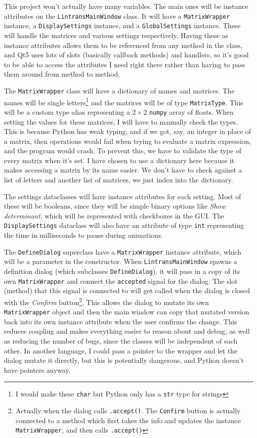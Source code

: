 \documentclass[../main.tex]{subfiles}
\begin{document}
This project won't actually have many variables. The main ones will be instance attributes on the \texttt{LintransMainWindow} class. It will have a \texttt{MatrixWrapper} instance, a \texttt{DisplaySettings} instance, and a \texttt{GlobalSettings} instance. These will handle the matrices and various settings respectively. Having these as instance attributes allows them to be referenced from any method in the class, and Qt5 uses lots of slots (basically callback methods) and handlers, so it's good to be able to access the attributes I need right there rather than having to pass them around from method to method.

The \texttt{MatrixWrapper} class will have a dictionary of names and matrices. The names will be single letters\footnote{I would make these \texttt{char} but Python only has a \texttt{str} type for strings} and the matrices will be of type \texttt{MatrixType}. This will be a custom type alias representing a $2 \times 2$ \texttt{numpy} array of floats. When setting the values for these matrices, I will have to manually check the types. This is because Python has weak typing, and if we got, say, an integer in place of a matrix, then operations would fail when trying to evaluate a matrix expression, and the program would crash. To prevent this, we have to validate the type of every matrix when it's set. I have chosen to use a dictionary here because it makes accessing a matrix by its name easier. We don't have to check against a list of letters and another list of matrices, we just index into the dictionary.

The settings dataclasses will have instance attributes for each setting. Most of these will be booleans, since they will be simple binary options like \textit{Show determinant}, which will be represented with checkboxes in the GUI. The \texttt{DisplaySettings} dataclass will also have an attribute of type \texttt{int} representing the time in milliseconds to pause during animations.

The \texttt{DefineDialog} superclass have a \texttt{MatrixWrapper} instance attribute, which will be a parameter in the constructor. When \texttt{LintransMainWindow} spawns a definition dialog (which subclasses \texttt{DefineDialog}), it will pass in a copy of its own \texttt{MatrixWrapper} and connect the \texttt{accepted} signal for the dialog. The slot (method) that this signal is connected to will get called when the dialog is closed with the \textit{Confirm} button\footnote{Actually when the dialog calls \texttt{.accept()}. The \texttt{Confirm} button is actually connected to a method which first takes the info and updates the instance \texttt{MatrixWrapper}, and then calls \texttt{.accept()}}. This allows the dialog to mutate its own \texttt{MatrixWrapper} object and then the main window can copy that mutated version back into its own instance attribute when the user confirms the change. This reduces coupling and makes everything easier to reason about and debug, as well as reducing the number of bugs, since the classes will be independent of each other. In another language, I could pass a pointer to the wrapper and let the dialog mutate it directly, but this is potentially dangerous, and Python doesn't have pointers anyway.
\end{document}
